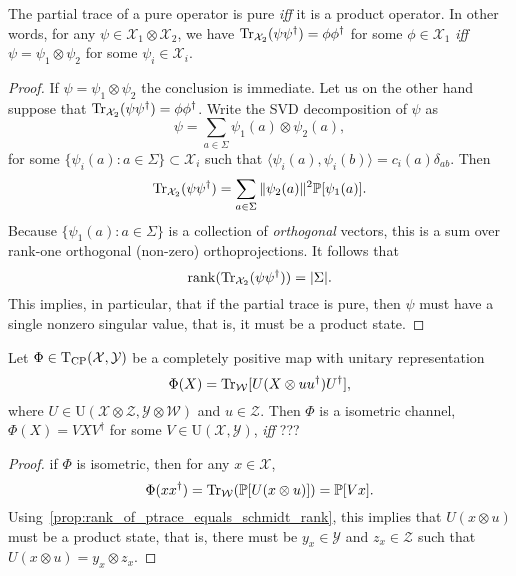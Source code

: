 \documentclass[12pt]{report}
\newcommand{\PP}{\mathbb{P}}
\newcommand{\calY}{{\mathcal{Y}}}
\newcommand{\calW}{{\mathcal{W}}}
\newcommand{\calX}{{\mathcal{X}}}
\newcommand{\calZ}{{\mathcal{Z}}}
\newcommand{\rmT}{{\mathrm{T}}}
\newcommand{\rmU}{{\mathrm{U}}}
\begin{document}
\begin{prop}\label{prop:rank_of_ptrace_equals_schmidt_rank}
	The partial trace of a pure operator is pure \emph{iff} it is a product operator.
	In other words, for any $\psi\in\calX_1\otimes\calX_2$, we have
	$\Tr_{\calX_2}(\psi\psi^\dagger)=\phi\phi^\dagger$ for some $\phi\in\calX_1$ \emph{iff} $\psi=\psi_1\otimes\psi_2$ for some $\psi_i\in\calX_i$.
\end{prop}
\begin{proof}
	If $\psi=\psi_1\otimes\psi_2$ the conclusion is immediate.
	Let us on the other hand suppose that
	$\Tr_{\calX_2}(\psi\psi^\dagger)=\phi\phi^\dagger$.
	Write the SVD decomposition of $\psi$ as
	\begin{equation}
		\psi = \sum_{a\in\Sigma} \psi_1(a)\otimes\psi_2(a),
	\end{equation}
	for some $\{\psi_i(a): a\in\Sigma\}\subset\calX_i$ such that
	$\langle \psi_i(a),\psi_i(b)\rangle = c_i(a) \delta_{ab}$.
	Then
	\begin{equation}
		\Tr_{\calX_2}(\psi\psi^\dagger)
		= \sum_{a\in\Sigma} \|\psi_2(a)\|^2 \PP[\psi_1(a)].
	\end{equation}
	Because $\{\psi_1(a):a\in\Sigma\}$ is a collection of \emph{orthogonal} vectors, this is a sum over rank-one orthogonal (non-zero) orthoprojections.
	It follows that
	\begin{equation}
		\rank(\Tr_{\calX_2}(\psi\psi^\dagger)) = \lvert\Sigma\rvert.
	\end{equation}
	This implies, in particular, that if the partial trace is pure, then $\psi$ must have a single nonzero singular value, that is, it must be a product state.
\end{proof}

\begin{prop}
	Let $\Phi\in\rmT_{\rm CP}(\calX,\calY)$ be a completely positive map with unitary representation
	\begin{equation}
		\Phi(X) = \Tr_\calW[U(X\otimes uu^\dagger)U^\dagger],
	\end{equation}
	where $U\in\rmU(\calX\otimes\calZ,\calY\otimes\calW)$ and $u\in\calZ$.
	Then $\Phi$ is a isometric channel, $\Phi(X)=VXV^\dagger$ for some $V\in\rmU(\calX,\calY)$, \emph{iff} ???
\end{prop}
\begin{proof}
	if $\Phi$ is isometric, then for any $x\in\calX$,
	\begin{equation}
		\Phi(xx^\dagger) = \Tr_\calW(\PP[U(x\otimes u)])
		= \PP[V x].
	\end{equation}
	Using~\cref{prop:rank_of_ptrace_equals_schmidt_rank}, this implies that $U(x\otimes u)$ must be a product state, that is, there must be $y_x\in\calY$ and $z_x\in\calZ$ such that $U(x\otimes u)=y_x\otimes z_x$.
\end{proof}
\end{document}
